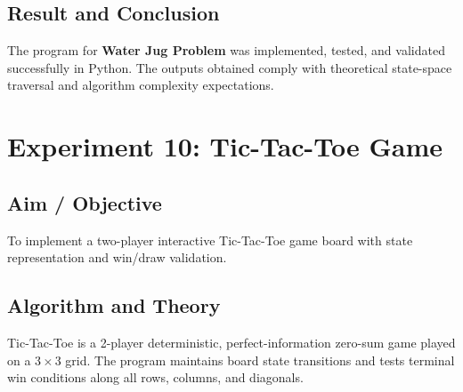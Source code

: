 \documentclass[11pt,a4paper]{report}
\begin{document}
\section{Result and Conclusion}
The program for \textbf{Water Jug Problem} was implemented, tested, and validated successfully in Python. The outputs obtained comply with theoretical state-space traversal and algorithm complexity expectations.

\newpage

\chapter{Experiment 10: Tic-Tac-Toe Game}

\section{Aim / Objective}
To implement a two-player interactive Tic-Tac-Toe game board with state representation and win/draw validation.

\section{Algorithm and Theory}
Tic-Tac-Toe is a 2-player deterministic, perfect-information zero-sum game played on a $3 \times 3$ grid. The program maintains board state transitions and tests terminal win conditions along all rows, columns, and diagonals.
\end{document}
